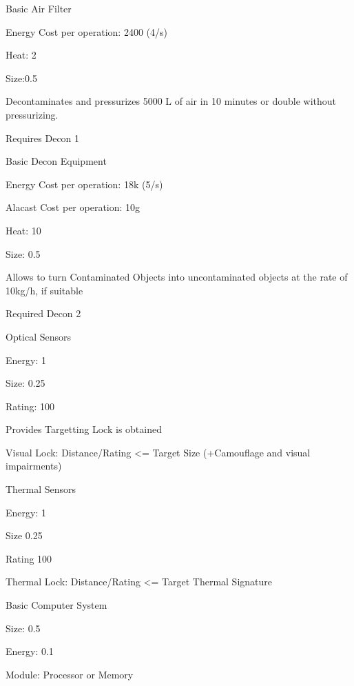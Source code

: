 Basic Air Filter\par
Energy Cost per operation: 2400 (4/s)\par
Heat: 2\par
Size:0.5\par
Decontaminates and pressurizes 5000 L of air in  10 minutes or double without pressurizing. \par
Requires Decon 1\par
\par
Basic Decon Equipment \par
Energy Cost per operation: 18k (5/s)\par
Alacast Cost per operation: 10g\par
Heat: 10 \par
Size: 0.5\par
Allows to turn Contaminated Objects into uncontaminated objects at the rate of 10kg/h, if suitable\par
Required Decon 2\par
\par
Optical Sensors\par
Energy: 1\par
Size: 0.25 \par
Rating: 100\par
Provides Targetting Lock is obtained\par
Visual Lock: Distance/Rating <= Target Size (+Camouflage and visual impairments)\par
\par
Thermal Sensors\par
Energy: 1\par
Size 0.25\par
Rating 100\par
Thermal Lock: Distance/Rating <= Target Thermal Signature\par
\par
Basic Computer System\par
Size: 0.5\par
Energy: 0.1\par
Module: Processor or Memory\par
\par
